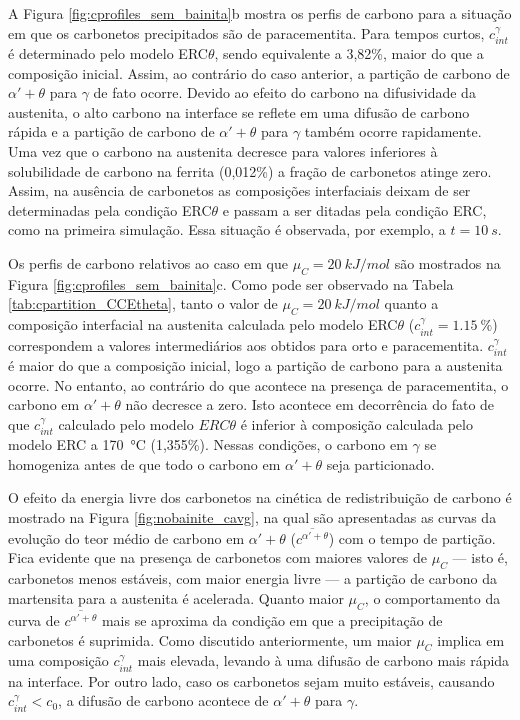 A Figura \ref{fig:cprofiles_sem_bainita}b mostra os perfis de carbono para a situação em que os carbonetos precipitados são de paracementita. Para tempos curtos, $c^\gamma_{int}$ é determinado pelo modelo ERC$\theta$, sendo equivalente a 3,82\%, maior do que a composição inicial. Assim, ao contrário do caso anterior, a partição de carbono de $\alpha' + \theta$ para $\gamma$ de fato ocorre. Devido ao efeito do carbono na difusividade da austenita, o alto carbono na interface se reflete em uma difusão de carbono rápida e a partição de carbono de $\alpha' + \theta$ para $\gamma$ também ocorre rapidamente. Uma vez que o carbono na austenita decresce para valores inferiores à solubilidade de carbono na ferrita (0,012\%) a fração de carbonetos atinge zero. Assim, na ausência de carbonetos as composições interfaciais deixam de ser determinadas pela condição ERC$\theta$ e passam a ser ditadas pela condição ERC, como na primeira simulação. Essa situação é observada, por exemplo, a $t=\SI{10}{s}$.

Os perfis de carbono relativos ao caso em que $\mu_C = \SI{20}{kJ/mol}$ são mostrados na Figura \ref{fig:cprofiles_sem_bainita}c. Como pode ser observado na Tabela \ref{tab:cpartition_CCEtheta}, tanto o valor de $\mu_C = \SI{20}{kJ/mol}$ quanto a composição interfacial na austenita calculada pelo modelo ERC$\theta$ ($c^\gamma_{int} = \SI{1.15}{\%}$) correspondem a valores intermediários aos obtidos para orto e paracementita. $c^\gamma_{int}$ é maior do que a composição inicial, logo a partição de carbono para a austenita ocorre. No entanto, ao contrário do que acontece na presença de paracementita, o carbono em $\alpha' + \theta$ não decresce a zero. Isto acontece em decorrência do fato de que $c^\gamma_{int}$ calculado pelo modelo $ERC\theta$ é inferior à composição calculada pelo modelo ERC a \SI{170}{\degreeCelsius} (1,355\%). Nessas condições, o carbono em $\gamma$ se homogeniza antes de que todo o carbono em $\alpha' + \theta$ seja particionado. 

O efeito da energia livre dos carbonetos na cinética de redistribuição de carbono é mostrado na Figura \ref{fig:nobainite_cavg}, na qual são apresentadas as curvas da evolução do teor médio de carbono em $\alpha' + \theta$ ($\overline{c^{\alpha' + \theta}}$) com o tempo de partição. Fica evidente que na presença de carbonetos com maiores valores de $\mu_C$ --- isto é, carbonetos menos estáveis, com maior energia livre --- a partição de carbono da martensita para a austenita é acelerada. Quanto maior $\mu_C$, o comportamento da curva de $\overline{c^{\alpha' + \theta}}$ mais se aproxima da condição em que a precipitação de carbonetos é suprimida.
Como discutido anteriormente, um maior $\mu_C$ implica em uma composição $c^\gamma_{int}$ mais elevada, levando à uma difusão de carbono mais rápida na interface.
Por outro lado, caso os carbonetos sejam muito estáveis, causando $c^\gamma_{int} < c_0$, a difusão de carbono acontece de $\alpha' + \theta$ para $\gamma$.

